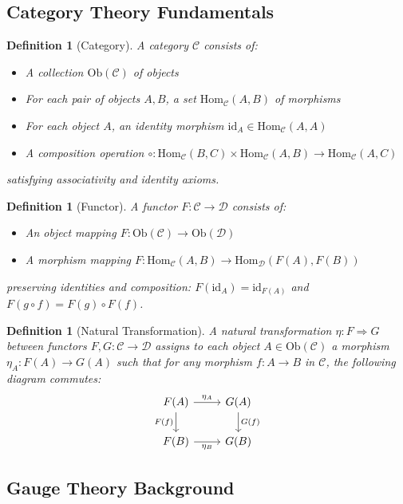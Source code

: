 \documentclass[12pt,a4paper]{article}
\newtheorem{definition}[theorem]{Definition}
\newcommand{\Hom}{\mathrm{Hom}}
\newcommand{\id}{\mathrm{id}}
\newcommand{\comp}{\circ}
\newcommand{\Ob}{\mathrm{Ob}}
\begin{document}
\subsection{Category Theory Fundamentals}

\begin{definition}[Category]
A category $\mathcal{C}$ consists of:
\begin{itemize}
\item A collection $\Ob(\mathcal{C})$ of objects
\item For each pair of objects $A,B$, a set $\Hom_{\mathcal{C}}(A,B)$ of morphisms
\item For each object $A$, an identity morphism $\id_A \in \Hom_{\mathcal{C}}(A,A)$
\item A composition operation $\comp: \Hom_{\mathcal{C}}(B,C) \times \Hom_{\mathcal{C}}(A,B) \to \Hom_{\mathcal{C}}(A,C)$
\end{itemize}
satisfying associativity and identity axioms.
\end{definition}

\begin{definition}[Functor]
A functor $F: \mathcal{C} \to \mathcal{D}$ consists of:
\begin{itemize}
\item An object mapping $F: \Ob(\mathcal{C}) \to \Ob(\mathcal{D})$
\item A morphism mapping $F: \Hom_{\mathcal{C}}(A,B) \to \Hom_{\mathcal{D}}(F(A),F(B))$
\end{itemize}
preserving identities and composition: $F(\id_A) = \id_{F(A)}$ and $F(g \comp f) = F(g) \comp F(f)$.
\end{definition}

\begin{definition}[Natural Transformation]
A natural transformation $\eta: F \Rightarrow G$ between functors $F,G: \mathcal{C} \to \mathcal{D}$ assigns to each object $A \in \Ob(\mathcal{C})$ a morphism $\eta_A: F(A) \to G(A)$ such that for any morphism $f: A \to B$ in $\mathcal{C}$, the following diagram commutes:
\[
\begin{tikzcd}
F(A) \arrow[r, "\eta_A"] \arrow[d, "F(f)"'] & G(A) \arrow[d, "G(f)"] \\
F(B) \arrow[r, "\eta_B"'] & G(B)
\end{tikzcd}
\]
\end{definition}

\subsection{Gauge Theory Background}
\end{document}
